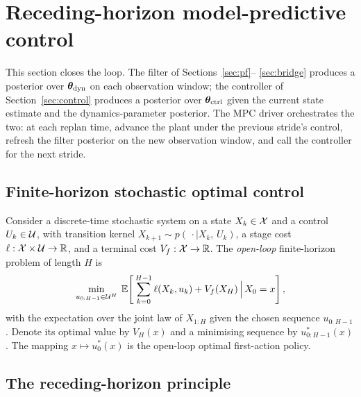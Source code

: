 \section{Receding-horizon model-predictive control} \label{sec:mpc}

This section closes the loop. The filter of Sections~\ref{sec:pf}--%
\ref{sec:bridge} produces a posterior over $\bm{\theta}_{\rm dyn}$ on each
observation window; the controller of Section~\ref{sec:control}
produces a posterior over $\bm{\theta}_{\rm ctrl}$ given the current state estimate
and the dynamics-parameter posterior. The MPC driver orchestrates the
two: at each replan time, advance the plant under the previous stride's
control, refresh the filter posterior on the new observation window,
and call the controller for the next stride.

\subsection{Finite-horizon stochastic optimal control}
\label{sec:mpc-finite}

Consider a discrete-time stochastic system on a state $X_k \in \mathcal{X}$
and a control $U_k \in \mathcal{U}$, with transition kernel
$X_{k+1} \sim p(\,\cdot \mid X_k,\, U_k)$, a stage cost
$\ell: \mathcal{X} \times \mathcal{U} \to \mathbb{R}$, and a terminal cost
$V_f: \mathcal{X} \to \mathbb{R}$. The \emph{open-loop} finite-horizon problem of
length $H$ is
\begin{equation}
\min_{u_{0:H-1} \in \mathcal{U}^H}
   \;\mathbb{E}\!\left[\,\sum_{k=0}^{H-1} \ell(X_k, u_k)
                + V_f(X_H)\,\Big|\,X_0 = x\right],
\label{eq:open-loop-fh}
\end{equation}
with the expectation over the joint law of $X_{1:H}$ given the chosen
sequence $u_{0:H-1}$. Denote its optimal value by $V_H(x)$ and a
minimising sequence by $u_{0:H-1}^*(x)$. The mapping
$x \mapsto u_0^*(x)$ is the open-loop optimal first-action policy.

\subsection{The receding-horizon principle} \label{sec:mpc-receding}

